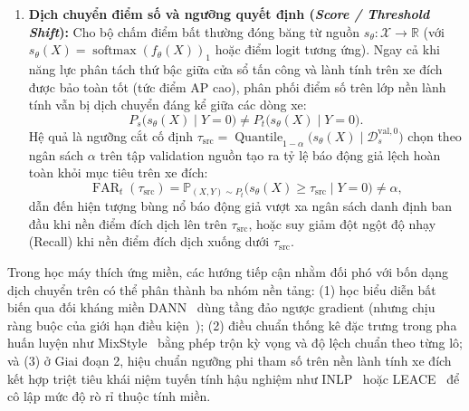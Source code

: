 \documentclass[12pt, a4paper, reqno, oneside]{book}
\begin{document}
\begin{enumerate}
\begin{equation}
    P_s(Y) \neq P_t(Y), \qquad P_s(X \mid Y) = P_t(X \mid Y).
    \end{equation}
    Dịch chuyển tiên nghiệm lớp giải thích tại sao các độ đo phụ thuộc tỷ lệ nền như Precision và F1 biến động mạnh giữa các kịch bản kiểm thử ngay cả khi mô hình duy trì xác suất phát hiện (TPR) và báo động giả (FPR) cố định, củng cố sự cần thiết của các độ đo độc lập tỷ lệ tiên nghiệm như ROC-AUC (đo lường độ phân tách bất biến tỷ lệ nhãn) kết hợp với đường cong PR-AUC / AP (đo lường năng lực xếp hạng không phụ thuộc ngưỡng dưới điều kiện mất cân bằng nhãn sâu sắc).
    \item \textbf{Dịch chuyển điểm số và ngưỡng quyết định (\textit{Score / Threshold Shift}):} Cho bộ chấm điểm bất thường đóng băng từ nguồn $s_\theta : \mathcal{X} \to \mathbb{R}$ (với $s_\theta(X) = \operatorname{softmax}(f_\theta(X))_1$ hoặc điểm logit tương ứng). Ngay cả khi năng lực phân tách thứ bậc giữa cửa sổ tấn công và lành tính trên xe đích được bảo toàn tốt (tức điểm AP cao), phân phối điểm số trên lớp nền lành tính vẫn bị dịch chuyển đáng kể giữa các dòng xe:
    \begin{equation}\label{eq:score-shift}
    P_s\big(s_\theta(X) \mid Y = 0\big) \neq P_t\big(s_\theta(X) \mid Y = 0\big).
    \end{equation}
    Hệ quả là ngưỡng cắt cố định $\tau_{\text{src}} = \operatorname{Quantile}_{1-\alpha}\!\big(s_\theta(X) \mid \mathcal{D}_s^{\text{val},0}\big)$ chọn theo ngân sách $\alpha$ trên tập validation nguồn tạo ra tỷ lệ báo động giả lệch hoàn toàn khỏi mục tiêu trên xe đích:
    \begin{equation}\label{eq:threshold-mismatch}
    \operatorname{FAR}_t(\tau_{\text{src}}) = \mathbb{P}_{(X,Y)\sim P_t}\big(s_\theta(X) \ge \tau_{\text{src}} \mid Y = 0\big) \neq \alpha,
    \end{equation}
    dẫn đến hiện tượng bùng nổ báo động giả vượt xa ngân sách danh định ban đầu khi nền điểm đích dịch lên trên $\tau_{\text{src}}$, hoặc suy giảm đột ngột độ nhạy (Recall) khi nền điểm đích dịch xuống dưới $\tau_{\text{src}}$.
\end{enumerate}

Trong học máy thích ứng miền, các hướng tiếp cận nhằm đối phó với bốn dạng dịch chuyển trên có thể phân thành ba nhóm nền tảng: (1) học biểu diễn bất biến qua đối kháng miền DANN~\cite{ganin2016dann} dùng tầng đảo ngược gradient (nhưng chịu ràng buộc của giới hạn điều kiện~\cite{zhao2019invariant}); (2) điều chuẩn thống kê đặc trưng trong pha huấn luyện như MixStyle~\cite{zhou2021mixstyle} bằng phép trộn kỳ vọng và độ lệch chuẩn theo từng lô; và (3) ở Giai đoạn 2, hiệu chuẩn ngưỡng phi tham số trên nền lành tính xe đích kết hợp triệt tiêu khái niệm tuyến tính hậu nghiệm như INLP~\cite{ravfogel2020null} hoặc LEACE~\cite{belrose2023leace} để cô lập mức độ rò rỉ thuộc tính miền.
\end{document}

